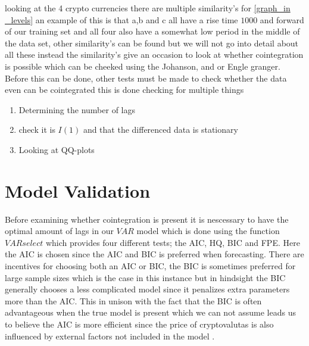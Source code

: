 \noindent looking at the 4 crypto currencies there are multiple similarity's for \ref{graph_in _levels} an example of this is that a,b and c all have a rise time $1000$ and forward of our training set and all four also have a somewhat low period in the middle of the data set, other similarity's can be found but we will not go into detail about all these instead the similarity's give an occasion to look at whether cointegration is possible which can be cheeked using the Johanson, and or Engle granger. Before this can be done, other tests must be made to check whether the data even can be cointegrated this is done checking for multiple things 
\begin{enumerate}
    \item Determining the number of lags
    \item check it is $I(1)$ and that the differenced data is stationary 
    \item Looking at QQ-plots
\end{enumerate}

\section{Model Validation}
Before examining whether cointegration is present it is nescessary to have the optimal amount of lags in our $VAR$ model which is done using the function $VARselect$ which provides four different tests; the AIC, HQ, BIC and FPE. Here the AIC is chosen since the AIC and BIC is preferred when forecasting. There are incentives for choosing both an AIC or BIC, the BIC is sometimes preferred for large sample sizes which is the case in this instance but in hindsight the BIC generally chooses a less complicated model since it penalizes extra parameters more than the AIC. This in unison with the fact that the BIC is often advantageous when the true model is present which we can not assume leads us to believe the AIC is more efficient since the price of cryptovalutas is also influenced by external factors not included in the model \cite{AICorBIC}.

